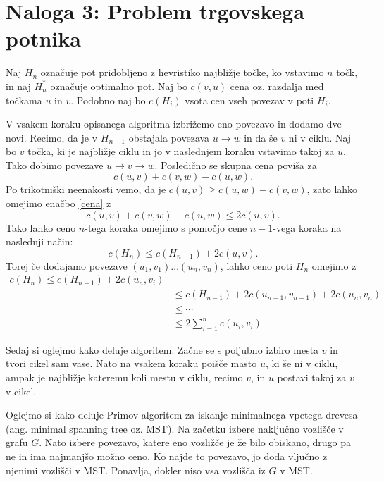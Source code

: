 \documentclass[fleqn]{article}
\begin{document}
\pagebreak

\section*{Naloga 3: Problem trgovskega potnika}

Naj $H_n$ označuje pot pridobljeno z hevristiko najbližje točke, ko vstavimo $n$ točk, in naj $H_n^*$ označuje optimalno pot.
Naj bo $c(v, u)$ cena oz. razdalja med točkama $u$ in $v$. Podobno naj bo $c(H_i)$ vsota cen vseh povezav v poti $H_i$.

V vsakem koraku opisanega algoritma izbrižemo eno povezavo in dodamo dve novi. 
Recimo, da je v $H_{n-1}$ obstajala povezava $u \rightarrow w$ in da še $v$ ni v ciklu.
Naj bo $v$ točka, ki je najbližje ciklu in jo v naslednjem koraku vstavimo takoj za $u$.
Tako dobimo povezave $u \rightarrow v \rightarrow w$.
Posledično se skupna cena poviša za 
\begin{equation}
    \label{cena}
    c(u, v) + c(v, w) - c(u, w) \text{.}
\end{equation}
Po trikotniški neenakosti vemo, da je $c(u, v) \geq c(u, w) - c(v, w)$, zato lahko omejimo enačbo \eqref{cena} z
$$ c(u, v) + c(v, w) - c(u, w) \leq 2 c(u, v) \text{.}$$
Tako lahko ceno $n$-tega koraka omejimo s pomočjo cene $n-1$-vega koraka na naslednji način:
$$ c(H_n) \leq c(H_{n-1}) + 2 c (u, v) \text{.} $$
Torej če dodajamo povezave $(u_1, v_1) \dots (u_n, v_n)$, lahko ceno poti $H_n$ omejimo z
\begin{align*}
    c(H_n) \leq c(H_{n-1}) + 2 c (u_n, v_i) \\
    &\leq c(H_{n-1}) + 2 c (u_{n-1}, v_{n-1}) + 2 c(u_n, v_n) \\
    &\leq \cdots \\
    &\leq 2 \sum_{i=1}^{n} c(u_i, v_i)
\end{align*}

Sedaj si oglejmo kako deluje algoritem. Začne se s poljubno izbiro mesta $v$ in tvori cikel sam vase.
Nato na vsakem koraku poišče masto $u$, ki še ni v ciklu, ampak je najbližje kateremu koli mestu v ciklu, recimo $v$, in $u$ postavi takoj za $v$ v cikel.

Oglejmo si kako deluje Primov algoritem za iskanje minimalnega vpetega drevesa (ang. minimal spanning tree oz. MST).
Na začetku izbere naključno vozlišče v grafu $G$. Nato izbere povezavo, katere eno vozližče je že bilo obiskano, drugo pa ne in ima najmanjšo možno ceno. 
Ko najde to povezavo, jo doda vljučno z njenimi vozlišči v MST. Ponavlja, dokler niso vsa vozlišča iz $G$ v MST.
\end{document}

